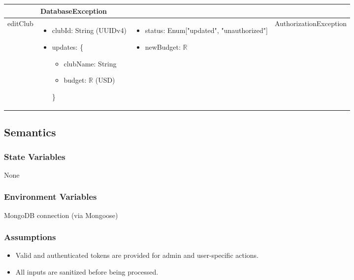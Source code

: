 \documentclass[12pt, titlepage]{article}
\begin{document}
\begin{center}
\begin{tabular}{p{2cm} p{4cm} p{2cm} p{4cm}}
\begin{minipage}{3.5cm}
\begin{itemize}[leftmargin=*,noitemsep]
  \end{itemize}
  \end{minipage} & 
  DatabaseException \\
  \hline
  editClub & 
  \begin{minipage}{3.5cm}
  \vspace{-0.2cm}
  \begin{itemize}[leftmargin=*,noitemsep]
    \item clubId: String (UUIDv4)
    \item updates: \{
      \begin{itemize}[leftmargin=*,noitemsep]
        \item clubName: String
        \item budget: $\mathbb{R}$ (USD)
      \end{itemize}\}
  \end{itemize}
  \end{minipage} & 
  \begin{minipage}{3.5cm}
  \vspace{-0.2cm}
  \begin{itemize}[leftmargin=*,noitemsep]
    \item status: Enum["updated", "unauthorized"]
    \item newBudget: $\mathbb{R}$
  \end{itemize}
  \end{minipage} & 
  AuthorizationException \\
  \hline
  \end{tabular}
  \end{center}

\subsection{Semantics}

\subsubsection{State Variables}
None

\subsubsection{Environment Variables}
MongoDB connection (via Mongoose)

\subsubsection{Assumptions}
\begin{itemize}
  \item Valid and authenticated tokens are provided for admin and user-specific actions.
  \item All inputs are sanitized before being processed.
\end{itemize}
\end{document}
